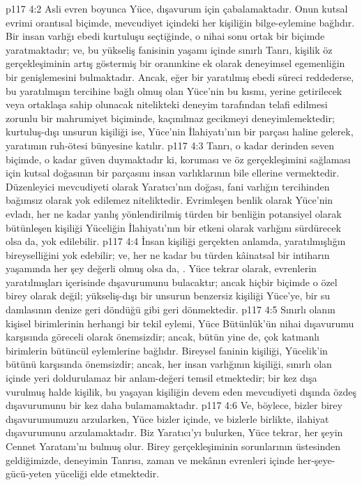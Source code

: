 \vs p117 4:2 Asli evren boyunca Yüce, dışavurum için çabalamaktadır. Onun kutsal evrimi orantısal biçimde, mevcudiyet içindeki her kişiliğin bilge\hyp{}eylemine bağlıdır. Bir insan varlığı ebedi kurtuluşu seçtiğinde, o nihai sonu ortak bir biçimde yaratmaktadır; ve, bu yükseliş fanisinin yaşamı içinde sınırlı Tanrı, kişilik öz gerçekleşiminin artış göstermiş bir oranınkine ek olarak deneyimsel egemenliğin bir genişlemesini bulmaktadır. Ancak, eğer bir yaratılmış ebedi süreci reddederse, bu yaratılmışın tercihine bağlı olmuş olan Yüce’nin bu kısmı, yerine getirilecek veya ortaklaşa sahip olunacak nitelikteki deneyim tarafından telafi edilmesi zorunlu bir mahrumiyet biçiminde, kaçınılmaz gecikmeyi deneyimlemektedir; kurtuluş\hyp{}dışı unsurun kişiliği ise, Yüce’nin İlahiyatı’nın bir parçası haline gelerek, yaratımın ruh\hyp{}ötesi bünyesine katılır.
\vs p117 4:3 Tanrı, o kadar derinden seven biçimde, o kadar güven duymaktadır ki, koruması ve öz gerçekleşimini sağlaması için kutsal doğasının bir parçasını insan varlıklarının bile ellerine vermektedir. Düzenleyici mevcudiyeti olarak Yaratıcı’nın doğası, fani varlığın tercihinden bağımsız olarak yok edilemez niteliktedir. Evrimleşen benlik olarak Yüce’nin evladı, her ne kadar yanlış yönlendirilmiş türden bir benliğin potansiyel olarak bütünleşen kişiliği Yüceliğin İlahiyatı’nın bir etkeni olarak varlığını sürdürecek olsa da, yok edilebilir.
\vs p117 4:4 İnsan kişiliği gerçekten anlamda, yaratılmışlığın bireyselliğini yok edebilir; ve, her ne kadar bu türden kâinatsal bir intiharın yaşamında her şey değerli olmuş olsa da, . Yüce tekrar olarak, evrenlerin yaratılmışları içerisinde dışavurumunu bulacaktır; ancak hiçbir biçimde o özel birey olarak değil; yükseliş\hyp{}dışı bir unsurun benzersiz kişiliği Yüce’ye, bir su damlasının denize geri döndüğü gibi geri dönmektedir.
\vs p117 4:5 Sınırlı olanın kişisel birimlerinin herhangi bir tekil eylemi, Yüce Bütünlük’ün nihai dışavurumu karşısında göreceli olarak önemsizdir; ancak, bütün yine de, çok katmanlı birimlerin bütüncül eylemlerine bağlıdır. Bireysel faninin kişiliği, Yücelik’in bütünü karşısında önemsizdir; ancak, her insan varlığının kişiliği, sınırlı olan içinde yeri doldurulamaz bir anlam\hyp{}değeri temsil etmektedir; bir kez dışa vurulmuş halde kişilik, bu yaşayan kişiliğin devem eden mevcudiyeti dışında özdeş dışavurumunu bir kez daha bulamamaktadır.
\vs p117 4:6 Ve, böylece, bizler birey dışavurumumuzu arzularken, Yüce bizler içinde, ve bizlerle birlikte, ilahiyat dışavurumunu arzulamaktadır. Biz Yaratıcı’yı bulurken, Yüce tekrar, her şeyin Cennet Yaratanı’nı bulmuş olur. Birey gerçekleşiminin sorunlarının üstesinden geldiğimizde, deneyimin Tanrısı, zaman ve mekânın evrenleri içinde her\hyp{}şeye\hyp{}gücü\hyp{}yeten yüceliği elde etmektedir.
